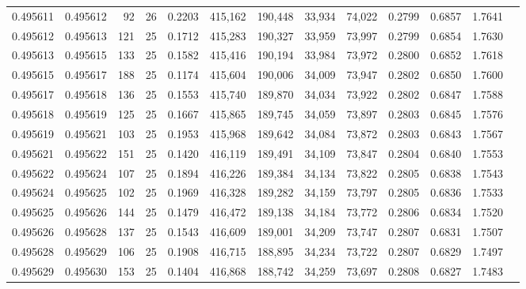 \begin{tabular}{rrrrrrrrrrrrr}
0.495611 & 0.495612 &    92 &  26 &                                     0.2203 & 415,162 & 190,448 &  33,934 &  74,022 & 0.2799 & 0.6857 & 1.7641 \\
0.495612 & 0.495613 &   121 &  25 &                                     0.1712 & 415,283 & 190,327 &  33,959 &  73,997 & 0.2799 & 0.6854 & 1.7630 \\
0.495613 & 0.495615 &   133 &  25 &                                     0.1582 & 415,416 & 190,194 &  33,984 &  73,972 & 0.2800 & 0.6852 & 1.7618 \\
0.495615 & 0.495617 &   188 &  25 &                                     0.1174 & 415,604 & 190,006 &  34,009 &  73,947 & 0.2802 & 0.6850 & 1.7600 \\
0.495617 & 0.495618 &   136 &  25 &                                     0.1553 & 415,740 & 189,870 &  34,034 &  73,922 & 0.2802 & 0.6847 & 1.7588 \\
0.495618 & 0.495619 &   125 &  25 &                                     0.1667 & 415,865 & 189,745 &  34,059 &  73,897 & 0.2803 & 0.6845 & 1.7576 \\
0.495619 & 0.495621 &   103 &  25 &                                     0.1953 & 415,968 & 189,642 &  34,084 &  73,872 & 0.2803 & 0.6843 & 1.7567 \\
0.495621 & 0.495622 &   151 &  25 &                                     0.1420 & 416,119 & 189,491 &  34,109 &  73,847 & 0.2804 & 0.6840 & 1.7553 \\
0.495622 & 0.495624 &   107 &  25 &                                     0.1894 & 416,226 & 189,384 &  34,134 &  73,822 & 0.2805 & 0.6838 & 1.7543 \\
0.495624 & 0.495625 &   102 &  25 &                                     0.1969 & 416,328 & 189,282 &  34,159 &  73,797 & 0.2805 & 0.6836 & 1.7533 \\
0.495625 & 0.495626 &   144 &  25 &                                     0.1479 & 416,472 & 189,138 &  34,184 &  73,772 & 0.2806 & 0.6834 & 1.7520 \\
0.495626 & 0.495628 &   137 &  25 &                                     0.1543 & 416,609 & 189,001 &  34,209 &  73,747 & 0.2807 & 0.6831 & 1.7507 \\
0.495628 & 0.495629 &   106 &  25 &                                     0.1908 & 416,715 & 188,895 &  34,234 &  73,722 & 0.2807 & 0.6829 & 1.7497 \\
0.495629 & 0.495630 &   153 &  25 &                                     0.1404 & 416,868 & 188,742 &  34,259 &  73,697 & 0.2808 & 0.6827 & 1.7483 \\

\end{tabular}
